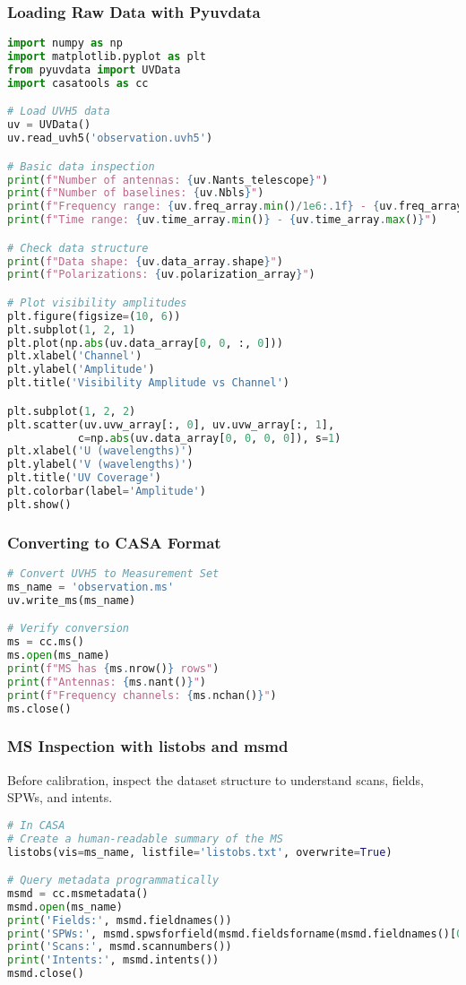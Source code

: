 \documentclass[11pt]{article}
\begin{document}
\subsubsection{Loading Raw Data with Pyuvdata}
\begin{lstlisting}[language=Python]
import numpy as np
import matplotlib.pyplot as plt
from pyuvdata import UVData
import casatools as cc

# Load UVH5 data
uv = UVData()
uv.read_uvh5('observation.uvh5')

# Basic data inspection
print(f"Number of antennas: {uv.Nants_telescope}")
print(f"Number of baselines: {uv.Nbls}")
print(f"Frequency range: {uv.freq_array.min()/1e6:.1f} - {uv.freq_array.max()/1e6:.1f} MHz")
print(f"Time range: {uv.time_array.min()} - {uv.time_array.max()}")

# Check data structure
print(f"Data shape: {uv.data_array.shape}")
print(f"Polarizations: {uv.polarization_array}")

# Plot visibility amplitudes
plt.figure(figsize=(10, 6))
plt.subplot(1, 2, 1)
plt.plot(np.abs(uv.data_array[0, 0, :, 0]))
plt.xlabel('Channel')
plt.ylabel('Amplitude')
plt.title('Visibility Amplitude vs Channel')

plt.subplot(1, 2, 2)
plt.scatter(uv.uvw_array[:, 0], uv.uvw_array[:, 1], 
           c=np.abs(uv.data_array[0, 0, 0, 0]), s=1)
plt.xlabel('U (wavelengths)')
plt.ylabel('V (wavelengths)')
plt.title('UV Coverage')
plt.colorbar(label='Amplitude')
plt.show()
\end{lstlisting}

\subsubsection{Converting to CASA Format}
\begin{lstlisting}[language=Python]
# Convert UVH5 to Measurement Set
ms_name = 'observation.ms'
uv.write_ms(ms_name)

# Verify conversion
ms = cc.ms()
ms.open(ms_name)
print(f"MS has {ms.nrow()} rows")
print(f"Antennas: {ms.nant()}")
print(f"Frequency channels: {ms.nchan()}")
ms.close()
\end{lstlisting}

\subsubsection{MS Inspection with listobs and msmd}
Before calibration, inspect the dataset structure to understand scans, fields, SPWs, and intents.
\begin{lstlisting}[language=Python]
# In CASA
# Create a human-readable summary of the MS
listobs(vis=ms_name, listfile='listobs.txt', overwrite=True)

# Query metadata programmatically
msmd = cc.msmetadata()
msmd.open(ms_name)
print('Fields:', msmd.fieldnames())
print('SPWs:', msmd.spwsforfield(msmd.fieldsforname(msmd.fieldnames()[0])[0]))
print('Scans:', msmd.scannumbers())
print('Intents:', msmd.intents())
msmd.close()
\end{lstlisting}
\end{document}
